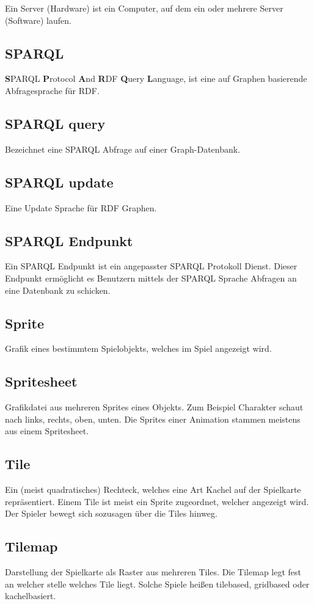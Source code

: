 \documentclass[11pt,a4paper]{article}
\begin{document}
Ein Server (Hardware) ist ein Computer, auf dem ein oder mehrere Server (Software) laufen.
\subsection{SPARQL}
\textbf{S}PARQL \textbf{P}rotocol \textbf{A}nd \textbf{R}DF \textbf{Q}uery \textbf{L}anguage, ist eine auf Graphen basierende Abfragesprache für RDF.
\subsection{SPARQL query}
Bezeichnet eine SPARQL Abfrage auf einer Graph-Datenbank.
\subsection{SPARQL update}
Eine Update Sprache für RDF Graphen.
\subsection{SPARQL Endpunkt}
Ein SPARQL Endpunkt ist ein angepasster SPARQL Protokoll Dienst.
Dieser Endpunkt ermöglicht es Benutzern mittels der SPARQL Sprache Abfragen an eine Datenbank zu schicken. 
\subsection{Sprite}
Grafik eines bestimmtem Spielobjekts, welches im Spiel angezeigt wird.
\subsection{Spritesheet}
Grafikdatei aus mehreren Sprites eines Objekts. Zum Beispiel Charakter schaut nach links, rechts, oben, unten.
Die Sprites einer Animation stammen meistens aus einem Spritesheet.
\subsection{Tile}
Ein (meist quadratisches) Rechteck, welches eine Art Kachel auf der Spielkarte repräsentiert.
Einem Tile ist meist ein Sprite zugeordnet, welcher angezeigt wird.
Der Spieler bewegt sich sozusagen über die Tiles hinweg.
\subsection{Tilemap}
Darstellung der Spielkarte als Raster aus mehreren Tiles. Die Tilemap legt fest an welcher stelle welches Tile liegt.
Solche Spiele heißen tilebased, gridbased oder kachelbasiert.
\end{document}
